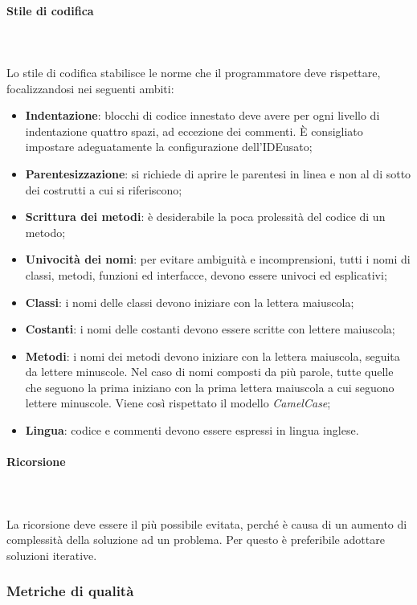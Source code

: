 		\paragraph{Stile di codifica} \mbox{} \\ \mbox{} \\
		Lo stile di codifica stabilisce le norme che il programmatore deve rispettare, focalizzandosi nei seguenti ambiti:
		\begin{itemize}
			\item \textbf{Indentazione}: blocchi di codice innestato deve avere per ogni livello di indentazione quattro spazi, ad eccezione dei commenti. È consigliato impostare adeguatamente la configurazione dell'IDE\glo usato;
			\item \textbf{Parentesizzazione}: si richiede di aprire le parentesi in linea e non al di sotto dei costrutti a cui si riferiscono;
			\item \textbf{Scrittura dei metodi}: è desiderabile la poca prolessità del codice di un metodo;
			\item \textbf{Univocità dei nomi}: per evitare ambiguità e incomprensioni, tutti i nomi di classi, metodi, funzioni ed interfacce, devono essere univoci ed esplicativi;
			\item \textbf{Classi}: i nomi delle classi devono iniziare con la lettera maiuscola;
			\item \textbf{Costanti}: i nomi delle costanti devono essere scritte con lettere maiuscola;
			\item \textbf{Metodi}: i nomi dei metodi devono iniziare con la lettera maiuscola, seguita da lettere minuscole. Nel caso di nomi composti da più parole, tutte quelle che seguono la prima iniziano con la prima lettera maiuscola a cui seguono lettere minuscole. Viene così rispettato il modello \textit{CamelCase}\glo;
			\item \textbf{Lingua}: codice e commenti devono essere espressi in lingua inglese.
		\end{itemize}
		\paragraph{Ricorsione} \mbox{} \\ \mbox{} \\
		La ricorsione deve essere il più possibile evitata, perché è causa di un aumento di complessità della soluzione ad un problema. Per questo è preferibile adottare soluzioni iterative.
	\subsubsection{Metriche di qualità}

